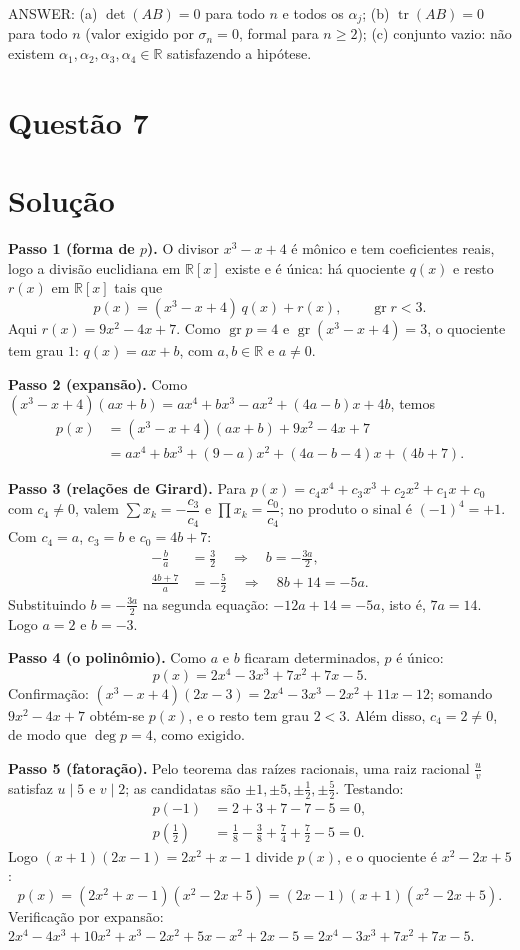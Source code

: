 \documentclass{article}%
\begin{document}
ANSWER: (a) $\det(AB)=0$ para todo $n$ e todos os $\alpha_j$; (b) $\operatorname{tr}(AB)=0$ para todo $n$ (valor exigido por $\sigma_n=0$, formal para $n\ge 2$); (c) conjunto vazio: não existem $\alpha_1,\alpha_2,\alpha_3,\alpha_4\in\mathbb{R}$ satisfazendo a hipótese.%
\newpage%
\section*{Questão 7}

\section*{Solução}

\textbf{Passo 1 (forma de $p$).} O divisor $x^3-x+4$ é mônico e tem coeficientes reais, logo a divisão euclidiana em $\mathbb{R}[x]$ existe e é única: há quociente $q(x)$ e resto $r(x)$ em $\mathbb{R}[x]$ tais que
\[
p(x)=(x^3-x+4)\,q(x)+r(x), \qquad \operatorname{gr} r<3 .
\]
Aqui $r(x)=9x^2-4x+7$. Como $\operatorname{gr} p=4$ e $\operatorname{gr}(x^3-x+4)=3$, o quociente tem grau $1$: $q(x)=ax+b$, com $a,b\in\mathbb{R}$ e $a\neq 0$.

\textbf{Passo 2 (expansão).} Como $(x^3-x+4)(ax+b)=ax^4+bx^3-ax^2+(4a-b)x+4b$, temos
\begin{align*}
p(x)&=(x^3-x+4)(ax+b)+9x^2-4x+7\\
&=ax^4+bx^3+(9-a)x^2+(4a-b-4)x+(4b+7).
\end{align*}

\textbf{Passo 3 (relações de Girard).} Para $p(x)=c_4x^4+c_3x^3+c_2x^2+c_1x+c_0$ com $c_4\neq 0$, valem $\sum x_k=-\dfrac{c_3}{c_4}$ e $\prod x_k=\dfrac{c_0}{c_4}$; no produto o sinal é $(-1)^4=+1$. Com $c_4=a$, $c_3=b$ e $c_0=4b+7$:
\begin{align*}
-\frac{b}{a}&=\frac{3}{2}\quad\Rightarrow\quad b=-\frac{3a}{2},\\
\frac{4b+7}{a}&=-\frac{5}{2}\quad\Rightarrow\quad 8b+14=-5a.
\end{align*}
Substituindo $b=-\frac{3a}{2}$ na segunda equação: $-12a+14=-5a$, isto é, $7a=14$. Logo $a=2$ e $b=-3$.

\textbf{Passo 4 (o polinômio).} Como $a$ e $b$ ficaram determinados, $p$ é único:
\[
p(x)=2x^4-3x^3+7x^2+7x-5 .
\]
Confirmação: $(x^3-x+4)(2x-3)=2x^4-3x^3-2x^2+11x-12$; somando $9x^2-4x+7$ obtém-se $p(x)$, e o resto tem grau $2<3$. Além disso, $c_4=2\neq 0$, de modo que $\deg p=4$, como exigido.

\textbf{Passo 5 (fatoração).} Pelo teorema das raízes racionais, uma raiz racional $\frac{u}{v}$ satisfaz $u\mid 5$ e $v\mid 2$; as candidatas são $\pm1,\pm5,\pm\frac12,\pm\frac52$. Testando:
\begin{align*}
p(-1)&=2+3+7-7-5=0,\\
p\left(\tfrac12\right)&=\tfrac18-\tfrac38+\tfrac74+\tfrac72-5=0.
\end{align*}
Logo $(x+1)(2x-1)=2x^2+x-1$ divide $p(x)$, e o quociente é $x^2-2x+5$:
\[
p(x)=(2x^2+x-1)(x^2-2x+5)=(2x-1)(x+1)(x^2-2x+5).
\]
Verificação por expansão: $2x^4-4x^3+10x^2+x^3-2x^2+5x-x^2+2x-5=2x^4-3x^3+7x^2+7x-5$.
\end{document}
